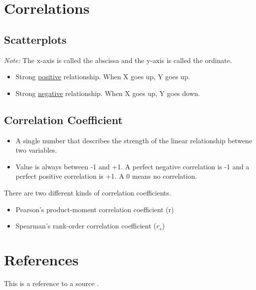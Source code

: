 \documentclass[11pt]{report}
\begin{document}
\section{Correlations}
\subsection{Scatterplots}
\textit{Note:} The x-axis is called the abscissa and the y-axis is called the ordinate. \newline 
\begin{itemize}
    \item Strong \underline{positive} relationship. When X goes up, Y goes up.
    \item Strong \underline{negative} relationship. When X goes up, Y goes down.
\end{itemize}

\subsection{Correlation Coefficient}
\begin{itemize}
    \item A single number that describes the strength of the linear relationship betwene two variables. 
    \item Value is always between -1 and +1. A perfect negative correlation is -1 and a perfect positive correlation is +1. A 0 means no correlation.
\end{itemize}

There are two different kinds of correlation coefficients. 
\begin{itemize}
    \item Pearson's product-moment correlation coefficient (r)
    \item Spearman's rank-order correlation coefficient ($r_s$)
\end{itemize}


\section{References}
This is a reference to a source \cite{example}.



\end{document}
